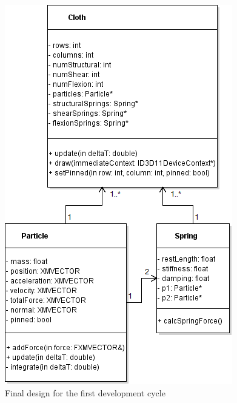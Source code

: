   \begin{figure}
    \begin{center}
      \includegraphics[scale=0.66]{Figures/cycle_1_final_design}
    \end{center}
    \caption{Final design for the first development cycle}
    \label{fig:phase1}
  \end{figure}

